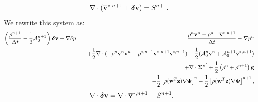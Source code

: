 \documentclass[final]{siamltex}
\def\gb {{\bf g}}
\def\vb {{\bf v}}
\def\wb {{\bf w}}
\def\zb {{\bf z}}
\def\deltab {\boldsymbol{\delta}}
\def\Phib   {\boldsymbol{\Phi}}
\def\Sigmab {\boldsymbol{\Sigma}}
\def\half   {\frac{1}{2}}
\begin{document}
\begin{equation}
\nabla\cdot(\overline\vb^{*,n+1} + \deltab\vb) = S^{n+1}.
\end{equation}
We rewrite this system as:
\begin{eqnarray}
\left(\frac{\rho^{n+1}}{\Delta t} - \half\mathcal{A}_0^{n+1}\right)\deltab\vb + \nabla\delta p &=& \frac{\rho^n\vb^n-\rho^{n+1}\overline\vb^{*,n+1}}{\Delta t} -\nabla p^n\nonumber\\
&&+ \half\nabla\cdot(-\rho^n\vb^n\vb^n - \rho^{*,n+1}\vb^{*,n+1}\vb^{*,n+1}) + \half(\mathcal{A}_0^n\vb^n + \mathcal{A}_0^{n+1}\overline\vb^{*,n+1} )\nonumber\\
&&+ \nabla\cdot\Sigmab^{n'} + \half\left(\rho^n+\rho^{n+1}\right)\gb\nonumber\\
&&- \half\left[\rho(\wb^T\zb)\nabla\Phib\right]^n - \half\left[\rho(\wb^T\zb)\nabla\Phib\right]^{n+1},
\end{eqnarray}
\begin{equation}
-\nabla\cdot\deltab\vb = \nabla\cdot\overline\vb^{*,n+1} - S^{n+1}.
\end{equation}
\end{document}
